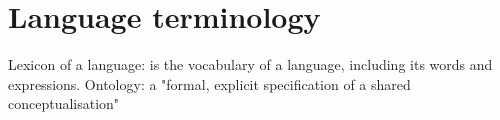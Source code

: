 
\section{Language terminology}
\label{Appendix:Language}
Lexicon of a language: is the vocabulary of a language, including its words and expressions.
Ontology: a "formal, explicit specification of a shared conceptualisation"

